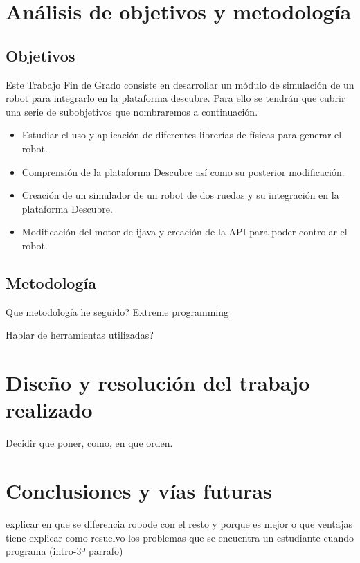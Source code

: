 \chapter{Análisis de objetivos y metodología}\label{objetivos-metodologia}

\section{Objetivos}
\label{sec:Objetivos}

Este Trabajo Fin de Grado consiste en desarrollar un módulo de simulación de un robot para integrarlo en la plataforma \Gls{descubre}. Para ello se tendrán que cubrir una serie de subobjetivos que nombraremos a continuación.
\begin{itemize}
\item Estudiar el uso y aplicación de diferentes librerías de físicas para generar el robot.
\item Comprensión de la plataforma Descubre así como su posterior modificación.
\item Creación de un simulador de un robot de dos ruedas y su integración en la plataforma Descubre.
\item Modificación del motor de \gls{ijava} y creación de la \acrshort{API} para poder controlar el robot.
\end{itemize}

\section{Metodología}
\label{sec:metodologia}

{\color{green}
Que metodología he seguido? Extreme programming


Hablar de herramientas utilizadas?
}

\chapter{Diseño y resolución del trabajo realizado}\label{diseno}


{\color{green}
Decidir que poner, como, en que orden.
}



\chapter{Conclusiones y vías futuras}\label{conslusiones}




{\color{blue}
explicar en que se diferencia robode con el resto y porque es mejor o que ventajas tiene
explicar como resuelvo los problemas que se encuentra un estudiante cuando programa (intro-3º parrafo)
}
